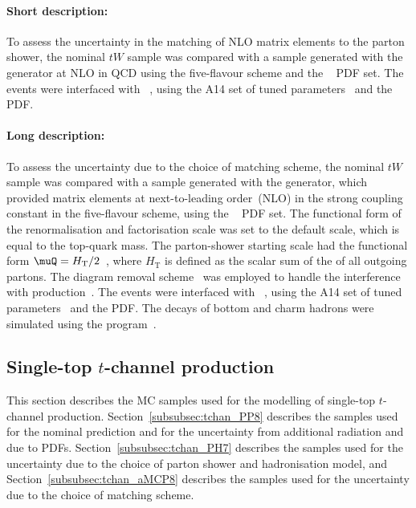 \paragraph{Short description:}

To assess the uncertainty in the matching of NLO matrix elements to the
parton shower, the nominal $tW$ sample was compared with a sample generated
with the \MGNLO[2.6.2] generator at NLO in QCD using the five-flavour
scheme and the \NNPDF[2.3nlo]~\cite{Ball:2014uwa} PDF set. The events were
interfaced with \PYTHIA[8.230]~\cite{Sjostrand:2014zea}, using the A14
set of tuned parameters~\cite{ATL-PHYS-PUB-2014-021} and the \NNPDF[2.3lo]
PDF.


\paragraph{Long description:}

To assess the uncertainty due to the choice of matching scheme, the nominal $tW$ sample was compared with a sample generated
with the \MGNLO[2.6.2] generator, which provided matrix elements at next-to-leading order~(NLO) in the strong coupling constant \alphas
in the five-flavour scheme, using the \NNPDF[2.3nlo]~\cite{Ball:2014uwa} PDF set.
The functional form of the renormalisation and factorisation scale was set to the default scale, which is equal to the top-quark mass.
The parton-shower starting scale had the functional form $\muQ = H_{\mathrm T}/2$~\cite{ATL-PHYS-PUB-2017-007}, 
where $H_{\mathrm T}$ is defined as the scalar sum of the \pT of all outgoing partons.
The diagram removal scheme~\cite{Frixione:2008yi} was employed to handle the interference with \ttbar production~\cite{ATL-PHYS-PUB-2016-020}.
The events were interfaced with \PYTHIA[8.230]~\cite{Sjostrand:2014zea}, using the A14 set of tuned parameters~\cite{ATL-PHYS-PUB-2014-021} 
and the \NNPDF[2.3lo] PDF.
The decays of bottom and charm hadrons were simulated using the \EVTGEN[1.6.0] program~\cite{Lange:2001uf}.


\subsection{Single-top \texorpdfstring{$t$}{t}-channel production}
\label{subsec:tchan}

This section describes the MC samples used for the modelling of single-top $t$-channel production.
Section~\ref{subsubsec:tchan_PP8} describes the \POWPY[8] samples used for the nominal prediction
and for the uncertainty from additional radiation and due to PDFs.
Section~\ref{subsubsec:tchan_PH7} describes the \POWHER[7] samples used for the uncertainty due to the choice of parton shower and hadronisation model,
and Section~\ref{subsubsec:tchan_aMCP8} describes the \MGNLOPY[8] samples used for the uncertainty due to the choice of matching scheme.

